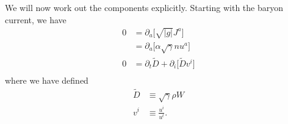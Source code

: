 \documentclass[12pt]{article}
\numberwithin{equation}{section}
\begin{document}
We will now work out the components explicitly.
Starting with the baryon current, we have
\begin{equation}
\begin{aligned}
0 &= \partial_a \big[ \sqrt{|g|} J^{a} \big] \\
&= \partial_a \big[ \alpha \sqrt{\gamma} n u^a \big] \\
0 &= \partial_t \tilde{D} + \partial_i \big[ \tilde{D} v^i \big] \\
\end{aligned}
\end{equation}
where we have defined
\begin{equation}
\begin{aligned}
\tilde{D} &\equiv \sqrt{\gamma} \rho W \\
v^{i} &\equiv \frac{u^i}{u^t}.
\end{aligned}
\end{equation}
\end{document}
